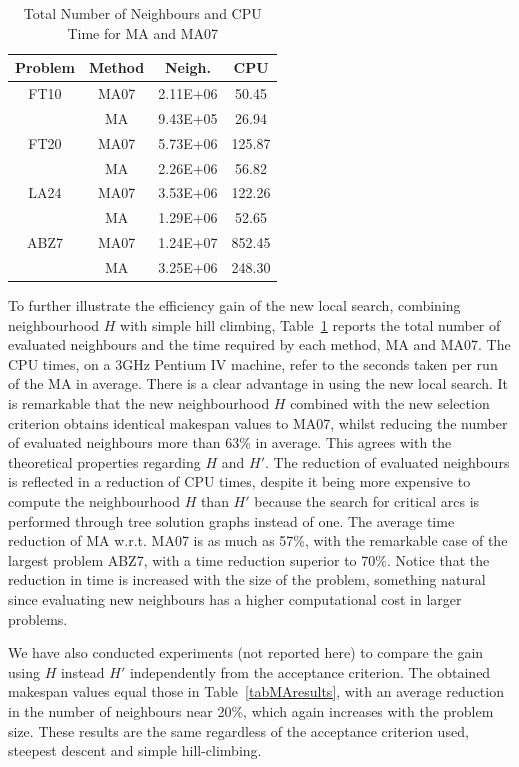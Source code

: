 \documentclass[letterpaper]{article}
\begin{document}
\begin{table}[ht]
\caption{\label{tabNeighbours+Time} Total Number of Neighbours and CPU Time for MA and MA07}
\begin{center}
\begin{tabular}{c|c|cc}
\hline\hline
Problem & Method & Neigh. & CPU\\
\hline\hline
FT10 & MA07 & 2.11E+06 & 50.45\\
    & MA & 9.43E+05 & 26.94\\
\hline
FT20 & MA07 & 5.73E+06 & 125.87\\
     & MA & 2.26E+06 & 56.82\\
\hline
LA24 & MA07 & 3.53E+06 & 122.26\\
     & MA & 1.29E+06 & 52.65\\
\hline
ABZ7 & MA07 & 1.24E+07 & 852.45\\
     & MA & 3.25E+06 & 248.30\\
 \hline\hline
\end{tabular}
\end{center}
\end{table}
To further illustrate the efficiency gain of the new local search, combining neighbourhood $H$ with simple hill climbing, Table~\ref{tabNeighbours+Time} reports the total number of evaluated neighbours and the time required by each method, MA and MA07. The CPU times, on a 3GHz Pentium IV machine, refer to the seconds taken per run of the MA in average. There is a clear advantage in using the new local search. It is remarkable that the new neighbourhood $H$ combined with the new selection criterion obtains identical makespan values to MA07, whilst reducing the number of evaluated neighbours more than 63\% in average. This agrees with the theoretical properties regarding $H$ and $H'$. The reduction of evaluated neighbours is reflected in a reduction of CPU times, despite it being more expensive to compute the neighbourhood $H$ than $H'$ because the search for critical arcs is performed through tree solution graphs instead of one. The average time reduction of MA w.r.t. MA07 is as much as 57\%, with the remarkable case of the largest problem ABZ7, with a time reduction superior to 70\%. Notice that the reduction in time is increased with the size of the problem, something natural since evaluating new neighbours has a higher computational cost in larger problems.

We have also conducted experiments (not reported here) to compare the gain using $H$ instead $H'$ independently from the acceptance criterion. The obtained makespan values equal those in Table~\ref{tabMAresults}, with an average reduction in the number of neighbours near 20\%, which again increases with the problem size. These results are the same regardless of the acceptance criterion used, steepest descent and simple hill-climbing.
\end{document}
